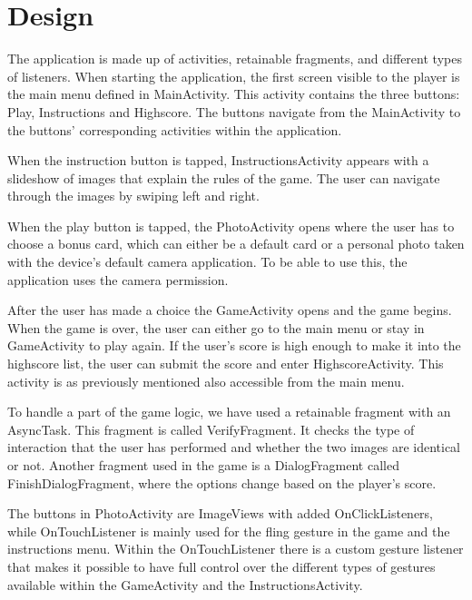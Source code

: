 \section{Design}
The application is made up of activities, retainable fragments, and different types of listeners. When starting the application, the first screen visible to the player is the main menu defined in MainActivity. This activity contains the three buttons: Play, Instructions and Highscore. The buttons navigate from the MainActivity to the buttons' corresponding activities within the application. 

When the instruction button is tapped, InstructionsActivity appears with a slideshow of images that explain the rules of the game. The user can navigate through the images by swiping left and right. \newline

When the play button is tapped, the PhotoActivity opens where the user has to choose a bonus card, which can either be a default card or a personal photo taken with the device’s default camera application. To be able to use this, the application uses the camera permission. \newline

After the user has made a choice the GameActivity opens and the game begins. When the game is over, the user can either go to the main menu or stay in GameActivity to play again. If the user’s score is high enough to make it into the highscore list, the user can submit the score and enter HighscoreActivity. This activity is as previously mentioned also accessible from the main menu. \newline

To handle a part of the game logic, we have used a retainable fragment with an AsyncTask. This fragment is called VerifyFragment. It checks the type of interaction that the user has performed and whether the two images are identical or not. Another fragment used in the game is a  DialogFragment called FinishDialogFragment, where the options change based on the player’s score. \newline

The buttons in PhotoActivity are ImageViews with added OnClickListeners, while OnTouchListener is mainly used for the fling gesture in the game and the instructions menu. Within the OnTouchListener there is a custom gesture listener that makes it possible to have full control over the different types of gestures available within the GameActivity and the InstructionsActivity.

